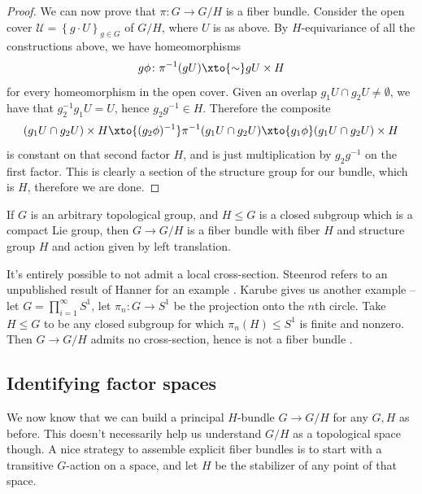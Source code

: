 \documentclass[11pt]{book}
\begin{document}
\begin{proof}
We can now prove that $\pi \colon G \to G/H$ is a fiber bundle. Consider the open cover $\mathcal{U} = \left\{ g\cdot U \right\}_{g\in G}$ of $G/H$, where $U$ is as above. By $H$-equivariance of all the constructions above, we have homeomorphisms
\begin{align*}
    g\phi \colon \pi^{-1}(gU) \xto{\sim} gU \times H
\end{align*}
for every homeomorphism in the open cover. Given an overlap $g_1U \cap g_2U \ne \emptyset$, we have that $g_2^{-1}g_1U = U$, hence $g_2 g^{-1} \in H$. Therefore the composite
\begin{align*}
    (g_1 U \cap g_2 U) \times H \xto{(g_2 \phi)^{-1}} \pi^{-1}(g_1 U \cap g_2 U) \xto{g_1 \phi} (g_1 U \cap g_2 U) \times H
\end{align*}
is constant on that second factor $H$, and is just multiplication by $g_2 g^{-1}$ on the first factor. This is clearly a section of the structure group for our bundle, which is $H$, therefore we are done.
\end{proof}

\begin{theorem} If $G$ is an arbitrary topological group, and $H \le G$ is a closed subgroup which is a compact Lie group, then $G \to G/H$ is a fiber bundle with fiber $H$ and structure group $H$ and action given by left translation.
\end{theorem}

\begin{remark} It's entirely possible to not admit a local cross-section. Steenrod refers to an unpublished result of Hanner for an example \cite[p.~33]{Steenrod-fibre-bundles}. Karube gives us another example -- let $G = \prod_{i=1}^\infty S^1$, let $\pi_n \colon G \to S^1$ be the projection onto the $n$th circle. Take $H \le G$ to be any closed subgroup for which $\pi_n(H) \le S^1$ is finite and nonzero. Then $G\to G/H$ admits no cross-section, hence is not a fiber bundle \cite{karubeLocalCrosssectionsLocally1958}.
\end{remark}



\subsection{Identifying factor spaces} We now know that we can build a principal $H$-bundle $G \to G/H$ for any $G,H$ as before. This doesn't necessarily help us understand $G/H$ as a topological space though. A nice strategy to assemble explicit fiber bundles is to start with a transitive $G$-action on a space, and let $H$ be the stabilizer of any point of that space.
\end{document}

